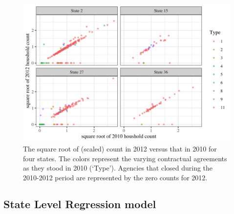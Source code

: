 \documentclass[ba]{imsart}
\newcommand{\response}[1]{{\color{blue}#1}}
\begin{document}
\begin{figure}[t]
\centering
\includegraphics[width=5in]{scatter_by_state.png}
\caption{The square root of (scaled) count in 2012 versus that in 2010 for four states. The colors represent the varying contractual agreements as they stood in 2010 (`Type').  Agencies that closed during the 2010-2012 period are represented by the zero counts for 2012.}
\label{fig:ctVct}
\end{figure}

\subsection{State Level Regression model}
\end{document}
